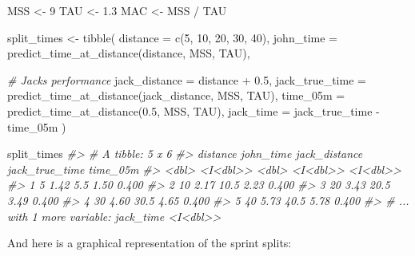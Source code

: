 \documentclass[fleqn,10pt,lineno]{wlpeerj} %
\newenvironment{Shaded}{\begin{snugshade}}{\end{snugshade}}
\newcommand{\AttributeTok}[1]{\textcolor[rgb]{0.77,0.63,0.00}{#1}}
\newcommand{\CommentTok}[1]{\textcolor[rgb]{0.56,0.35,0.01}{\textit{#1}}}
\newcommand{\DecValTok}[1]{\textcolor[rgb]{0.00,0.00,0.81}{#1}}
\newcommand{\FloatTok}[1]{\textcolor[rgb]{0.00,0.00,0.81}{#1}}
\newcommand{\FunctionTok}[1]{\textcolor[rgb]{0.00,0.00,0.00}{#1}}
\newcommand{\NormalTok}[1]{#1}
\newcommand{\OtherTok}[1]{\textcolor[rgb]{0.56,0.35,0.01}{#1}}
\newcommand{\SpecialCharTok}[1]{\textcolor[rgb]{0.00,0.00,0.00}{#1}}
\begin{document}
\begin{Shaded}
\begin{Highlighting}[]
\NormalTok{MSS }\OtherTok{\textless{}{-}} \DecValTok{9}
\NormalTok{TAU }\OtherTok{\textless{}{-}} \FloatTok{1.3}
\NormalTok{MAC }\OtherTok{\textless{}{-}}\NormalTok{ MSS }\SpecialCharTok{/}\NormalTok{ TAU}

\NormalTok{split\_times }\OtherTok{\textless{}{-}} \FunctionTok{tibble}\NormalTok{(}
  \AttributeTok{distance =} \FunctionTok{c}\NormalTok{(}\DecValTok{5}\NormalTok{, }\DecValTok{10}\NormalTok{, }\DecValTok{20}\NormalTok{, }\DecValTok{30}\NormalTok{, }\DecValTok{40}\NormalTok{),}
  \AttributeTok{john\_time =} \FunctionTok{predict\_time\_at\_distance}\NormalTok{(distance, MSS, TAU),}

  \CommentTok{\# Jack\textquotesingle{}s performance}
  \AttributeTok{jack\_distance =}\NormalTok{ distance }\SpecialCharTok{+} \FloatTok{0.5}\NormalTok{,}
  \AttributeTok{jack\_true\_time =} \FunctionTok{predict\_time\_at\_distance}\NormalTok{(jack\_distance, MSS, TAU),}
  \AttributeTok{time\_05m =} \FunctionTok{predict\_time\_at\_distance}\NormalTok{(}\FloatTok{0.5}\NormalTok{, MSS, TAU),}
  \AttributeTok{jack\_time =}\NormalTok{ jack\_true\_time }\SpecialCharTok{{-}}\NormalTok{ time\_05m}
\NormalTok{)}

\NormalTok{split\_times}
\CommentTok{\#\textgreater{} \# A tibble: 5 x 6}
\CommentTok{\#\textgreater{}   distance john\_time jack\_distance jack\_true\_time time\_05m}
\CommentTok{\#\textgreater{}      \textless{}dbl\textgreater{}  \textless{}I\textless{}dbl\textgreater{}\textgreater{}         \textless{}dbl\textgreater{}       \textless{}I\textless{}dbl\textgreater{}\textgreater{} \textless{}I\textless{}dbl\textgreater{}\textgreater{}}
\CommentTok{\#\textgreater{} 1        5      1.42           5.5           1.50    0.400}
\CommentTok{\#\textgreater{} 2       10      2.17          10.5           2.23    0.400}
\CommentTok{\#\textgreater{} 3       20      3.43          20.5           3.49    0.400}
\CommentTok{\#\textgreater{} 4       30      4.60          30.5           4.65    0.400}
\CommentTok{\#\textgreater{} 5       40      5.73          40.5           5.78    0.400}
\CommentTok{\#\textgreater{} \# ... with 1 more variable: jack\_time \textless{}I\textless{}dbl\textgreater{}\textgreater{}}
\end{Highlighting}
\end{Shaded}

And here is a graphical representation of the sprint splits:
\end{document}
